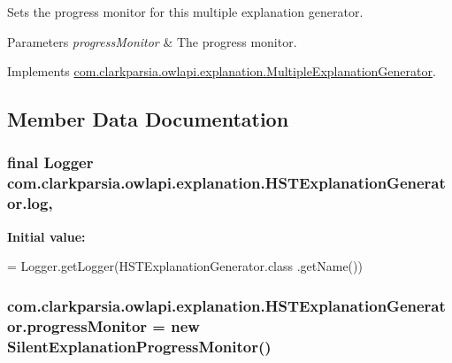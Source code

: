 Sets the progress monitor for this multiple explanation generator. 
\begin{DoxyParams}{Parameters}
{\em progress\-Monitor} & The progress monitor. \\
\hline
\end{DoxyParams}


Implements \hyperlink{interfacecom_1_1clarkparsia_1_1owlapi_1_1explanation_1_1_multiple_explanation_generator_aa569f6b193c00707a5702c937005ec88}{com.\-clarkparsia.\-owlapi.\-explanation.\-Multiple\-Explanation\-Generator}.



\subsection{Member Data Documentation}
\hypertarget{classcom_1_1clarkparsia_1_1owlapi_1_1explanation_1_1_h_s_t_explanation_generator_a2fac81a8439dd8c3dc2c97379f8163e1}{
\subsubsection[{log}]{\setlength{\rightskip}{0pt plus 5cm}final Logger com.\-clarkparsia.\-owlapi.\-explanation.\-H\-S\-T\-Explanation\-Generator.\-log\hspace{0.3cm}{\ttfamily [static]}, {\ttfamily [private]}}}\label{classcom_1_1clarkparsia_1_1owlapi_1_1explanation_1_1_h_s_t_explanation_generator_a2fac81a8439dd8c3dc2c97379f8163e1}
{\bfseries Initial value\-:}
\begin{DoxyCode}
= Logger.getLogger(HSTExplanationGenerator.class
            .getName())
\end{DoxyCode}
\hypertarget{classcom_1_1clarkparsia_1_1owlapi_1_1explanation_1_1_h_s_t_explanation_generator_a7bdbc0d09a1d9d0067b51c99cd479d82}{
\subsubsection[{progress\-Monitor}]{ com.\-clarkparsia.\-owlapi.\-explanation.\-H\-S\-T\-Explanation\-Generator.\-progress\-Monitor = new {\bf Silent\-Explanation\-Progress\-Monitor}()\hspace{0.3cm}{\ttfamily [private]}}}\label{classcom_1_1clarkparsia_1_1owlapi_1_1explanation_1_1_h_s_t_explanation_generator_a7bdbc0d09a1d9d0067b51c99cd479d82}
